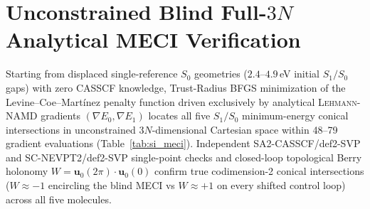 \documentclass[10pt]{article}
\theoremstyle{natthm}
\newcommand{\leh}{\textsc{Lehmann-NAMD}}
\begin{document}
\begin{table}[htbp]
  \centering
  \caption{Theorem 4 matched single-core (\texttt{OMP/OPENBLAS=1}) DF-PBE0/def2-SVP (\texttt{grids\_level=2}) scaling ladder from 5 to 24 atoms (15 to 72 Cartesian DOF) computing $E_0, E_1, \nabla E_0, \nabla E_1, \mathbf{d}_{01}^{\mathrm{CI}}$ simultaneously in one pass (empirical fit $t_{\mathrm{anal}} \propto N_{\mathrm{AO}}^{2.58}$).}
  \label{tab:si_th4}
\end{table}

\section{Unconstrained Blind Full-\texorpdfstring{$3N$}{3N} Analytical MECI Verification}

Starting from displaced single-reference $S_0$ geometries ($2.4$--$4.9$\,eV initial $S_1/S_0$ gaps) with zero CASSCF knowledge, Trust-Radius BFGS minimization of the Levine--Coe--Mart\'inez penalty function\cite{levine2008meci} driven exclusively by analytical \leh{} gradients $(\nabla E_0, \nabla E_1)$ locates all five $S_1/S_0$ minimum-energy conical intersections in unconstrained $3N$-dimensional Cartesian space within 48--79 gradient evaluations (Table~\ref{tab:si_meci}).
Independent SA2-CASSCF/def2-SVP and SC-NEVPT2/def2-SVP single-point checks and closed-loop topological Berry holonomy $W = \mathbf{u}_0(2\pi)\cdot\mathbf{u}_0(0)$ confirm true codimension-2 conical intersections ($W \approx -1$ encircling the blind MECI vs $W \approx +1$ on every shifted control loop) across all five molecules.
\end{document}
